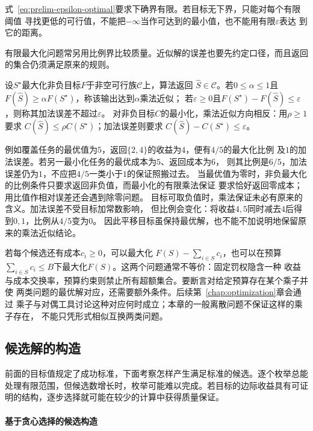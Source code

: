 式~\eqref{eq:prelim-epsilon-optimal}要求下确界有限。若目标无下界，只能对每个有限阈值
寻找更低的可行值，不能把$-\infty$当作可达到的最小值，也不能用有限$\varepsilon$表达
到它的距离。

有限最大化问题常另用比例界比较质量。近似解的误差也要先约定口径，而且返回的集合仍须满足原来的规则。
\begin{definition}[乘法近似与加法误差]
\label{def:comb-approximation-guarantee}
设$S^\star$最大化非负目标$F$于非空可行族$\mathcal C$上，算法返回
$\widehat S\in\mathcal C$。若$0\leq\alpha\leq1$且
$F(\widehat S)\geq\alpha F(S^\star)$，称该输出达到$\alpha$乘法近似；
若$\varepsilon\geq0$且$F(S^\star)-F(\widehat S)\leq\varepsilon$，则称其加法误差不超过$\varepsilon$。
对非负目标$C$的最小化，乘法近似方向相反：用$\rho\geq1$要求
$C(\widehat S)\leq\rho C(S^\star)$；加法误差则要求
$C(\widehat S)-C(S^\star)\leq\varepsilon$。
\end{definition}
例如覆盖任务的最优值为$5$，返回$\{2,4\}$的收益为$4$，便有$4/5$的最大化比例
及$1$的加法误差。若另一最小化任务的最优成本为$5$、返回成本为$6$，
则其比例是$6/5$，加法误差仍为$1$，不应把$4/5$一类小于$1$的保证照搬过去。
当最优值为零时，非负最大化的比例条件只要求返回非负值，而最小化的有限乘法保证
要求恰好返回零成本；用比值作相对误差还会遇到除零问题。
目标可取负值时，乘法保证未必有原来的含义。加法误差不受目标加常数影响，
但比例会变化：将收益$4,5$同时减去$4$后得到$0,1$，比例从$4/5$变为$0$。
因此平移目标虽保持最优解，也不能不加说明地保留原来的乘法近似结论。

若每个候选还有成本$c_i\geq0$，可以最大化
$F(S)-\sum_{i\in S}c_i$，也可以在预算
$\sum_{i\in S}c_i\leq B$下最大化$F(S)$。这两个问题通常不等价：固定罚权隐含一种
收益与成本交换率，预算约束则禁止所有超额集合。要断言对给定预算存在某个乘子并使
两类问题的最优解对应，还需要额外条件。后续第~\ref{chap:optimization}章会通过
乘子与对偶工具讨论这种对应何时成立；本章的一般离散问题不保证这样的乘子存在，
不能只凭形式相似互换两类问题。

\subsection{候选解的构造}
\label{sec:comb-methods-certificates}

前面的目标值规定了成功标准，下面考察怎样产生满足标准的候选。逐个枚举总能处理有限范围，但候选数增长时，枚举可能难以完成。若目标的边际收益具有可证明的结构，逐步选择就可能在较少的计算中获得质量保证。

\paragraph{基于贪心选择的候选构造}
\label{sec:comb-greedy-method}

